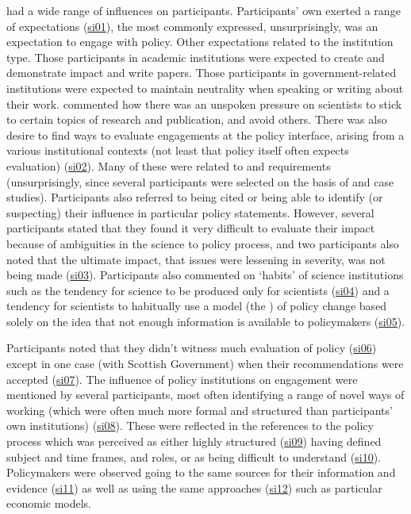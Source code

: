 \skiinst{} had a wide range of influences on participants. Participants' own \skiinst{} exerted a range of expectations (\hyperref[tab:resskiinst]{si01}), the most commonly expressed, unsurprisingly, was an expectation to engage with policy. Other expectations related to the institution type. Those participants in academic institutions were expected to create and demonstrate impact and write papers. Those participants in government-related institutions were expected to maintain neutrality when speaking or writing about their work.  commented how there was an unspoken pressure on scientists to stick to certain topics of research and publication, and avoid others. There was also desire to find ways to evaluate engagements at the policy interface, arising from a various institutional contexts (not least that policy itself often expects evaluation) (\hyperref[tab:resskiinst]{si02}). Many of these were related to \REF{} and \UKRI{} requirements (unsurprisingly, since several participants were selected on the basis of \REF{} and \UKRI{} case studies). Participants also referred to being cited or being able to identify (or suspecting) their influence in particular policy statements. However, several participants stated that they found it very difficult to evaluate their impact because of ambiguities in the science to policy process, and two participants also noted that the ultimate impact, that \CAN{} issues were lessening in severity, was not being made (\hyperref[tab:resskiinst]{si03}). Participants also commented on `habits' of science institutions such as the tendency for science to be produced only for scientists (\hyperref[tab:resskiinst]{si04}) and a tendency for scientists to habitually use a model (the \IDM) of policy change based solely on the idea that not enough information is available to policymakers (\hyperref[tab:resskiinst]{si05}). 

Participants noted that they didn't witness much evaluation of policy (\hyperref[tab:resskiinst]{si06}) except in one case (with Scottish Government) when their recommendations were accepted (\hyperref[tab:resskiinst]{si07}). The influence of policy institutions on engagement were mentioned by several participants, most often identifying a range of novel ways of working (which were often much more formal and structured than participants' own institutions) (\hyperref[tab:resskiinst]{si08}). These were reflected in the references to the policy process which was perceived as either highly structured (\hyperref[tab:resskiinst]{si09}) having defined subject and time frames, and roles, or as being difficult to understand (\hyperref[tab:resskiinst]{si10}). Policymakers were observed going to the same sources for their information and evidence (\hyperref[tab:resskiinst]{si11}) as well as using the same approaches (\hyperref[tab:resskiinst]{si12}) such as particular economic models.

